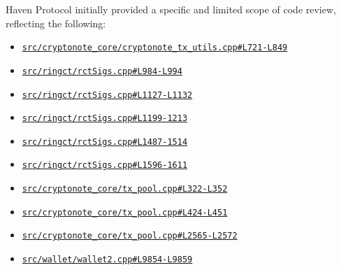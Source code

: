 \documentclass{article}
\begin{document}
Haven Protocol initially provided a specific and limited scope of code review, reflecting the following:
\begin{itemize}
\item \href{https://github.com/haven-protocol-org/haven-main/blob/6def97c4bdee0750d2f50f3aa61cc25e2128ae67/src/cryptonote_core/cryptonote_tx_utils.cpp#L721-L849}{\texttt{src/cryptonote\_core/cryptonote\_tx\_utils.cpp\#L721-L849}}
\item \href{https://github.com/haven-protocol-org/haven-main/blob/6def97c4bdee0750d2f50f3aa61cc25e2128ae67/src/ringct/rctSigs.cpp#L984-L994}{\texttt{src/ringct/rctSigs.cpp\#L984-L994}}
\item \href{https://github.com/haven-protocol-org/haven-main/blob/6def97c4bdee0750d2f50f3aa61cc25e2128ae67/src/ringct/rctSigs.cpp#L1127-L1132}{\texttt{src/ringct/rctSigs.cpp\#L1127-L1132}}
\item \href{https://github.com/haven-protocol-org/haven-main/blob/6def97c4bdee0750d2f50f3aa61cc25e2128ae67/src/ringct/rctSigs.cpp#L1199-L1213}{\texttt{src/ringct/rctSigs.cpp\#L1199-1213}}
\item \href{https://github.com/haven-protocol-org/haven-main/blob/6def97c4bdee0750d2f50f3aa61cc25e2128ae67/src/ringct/rctSigs.cpp#L1487-L1514}{\texttt{src/ringct/rctSigs.cpp\#L1487-1514}}
\item \href{https://github.com/haven-protocol-org/haven-main/blob/6def97c4bdee0750d2f50f3aa61cc25e2128ae67/src/ringct/rctSigs.cpp#L1596-L1611}{\texttt{src/ringct/rctSigs.cpp\#L1596-1611}}
\item \href{https://github.com/haven-protocol-org/haven-main/blob/6def97c4bdee0750d2f50f3aa61cc25e2128ae67/src/cryptonote_core/tx_pool.cpp#L322-L352}{\texttt{src/cryptonote\_core/tx\_pool.cpp\#L322-L352}}
\item \href{https://github.com/haven-protocol-org/haven-main/blob/6def97c4bdee0750d2f50f3aa61cc25e2128ae67/src/cryptonote_core/tx_pool.cpp#L424-L451}{\texttt{src/cryptonote\_core/tx\_pool.cpp\#L424-L451}}
\item \href{https://github.com/haven-protocol-org/haven-main/blob/6def97c4bdee0750d2f50f3aa61cc25e2128ae67/src/cryptonote_core/tx_pool.cpp#L2565-L2572}{\texttt{src/cryptonote\_core/tx\_pool.cpp\#L2565-L2572}}
\item \href{https://github.com/haven-protocol-org/haven-main/blob/6def97c4bdee0750d2f50f3aa61cc25e2128ae67/src/wallet/wallet2.cpp#L9854-L9859}{\texttt{src/wallet/wallet2.cpp\#L9854-L9859}}
\end{itemize}
\end{document}
